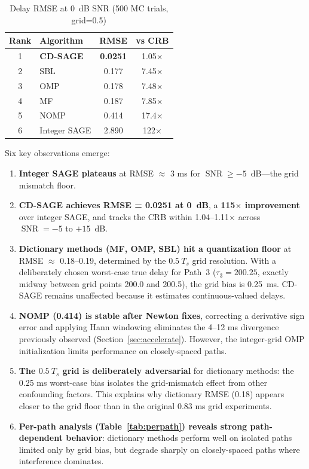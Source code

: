 \documentclass[a4paper,fleqn]{cas-dc}
\DeclareMathOperator{\SNR}{SNR}
\begin{document}
\begin{table}[cols=3,pos=h]
\centering
\caption{Delay RMSE at 0~dB SNR (500 MC trials, grid=0.5)}
\label{tab:ranking}
\small
\begin{tabular}{@{}clcc@{}}
\toprule
Rank & Algorithm & RMSE & vs CRB \\
\midrule
1 & \textbf{CD-SAGE} & \textbf{0.0251} & 1.05$\times$ \\
2 & SBL & 0.177 & 7.45$\times$ \\
3 & OMP & 0.178 & 7.48$\times$ \\
4 & MF & 0.187 & 7.85$\times$ \\
5 & NOMP & 0.414 & 17.4$\times$ \\
6 & Integer SAGE & 2.890 & 122$\times$ \\
\bottomrule
\end{tabular}
\end{table}

Six key observations emerge:

\begin{enumerate}
\item \textbf{Integer SAGE plateaus} at RMSE $\approx$ 3 ms for $\SNR \ge -5$~dB---the grid mismatch floor.
\item \textbf{CD-SAGE achieves RMSE = 0.0251 at 0~dB}, a \textbf{115$\times$ improvement} over integer SAGE, and tracks the CRB within 1.04--1.11$\times$ across $\SNR = -5$ to $+15$~dB.
\item \textbf{Dictionary methods (MF, OMP, SBL) hit a quantization floor} at RMSE $\approx$ 0.18--0.19, determined by the $0.5\ T_s$ grid resolution. With a deliberately chosen worst-case true delay for Path~3 ($\tau_3 = 200.25$, exactly midway between grid points 200.0 and 200.5), the grid bias is 0.25~ms. CD-SAGE remains unaffected because it estimates continuous-valued delays.
\item \textbf{NOMP (0.414) is stable after Newton fixes}, correcting a derivative sign error and applying Hann windowing eliminates the 4--12 ms divergence previously observed (Section~\ref{sec:accelerate}). However, the integer-grid OMP initialization limits performance on closely-spaced paths.
\item \textbf{The $0.5\ T_s$ grid is deliberately adversarial} for dictionary methods: the 0.25 ms worst-case bias isolates the grid-mismatch effect from other confounding factors. This explains why dictionary RMSE (0.18) appears closer to the grid floor than in the original 0.83 ms grid experiments.
\item \textbf{Per-path analysis (Table~\ref{tab:perpath}) reveals strong path-dependent behavior}: dictionary methods perform well on isolated paths limited only by grid bias, but degrade sharply on closely-spaced paths where interference dominates.
\end{enumerate}
\end{document}
